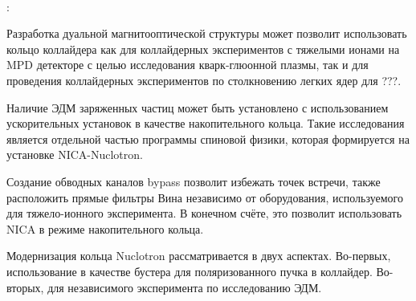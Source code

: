 ~\\
\par {\influence}:
\par Разработка дуальной магнитооптической структуры может позволит использовать кольцо коллайдера как для коллайдерных экспериментов с тяжелыми ионами на MPD детекторе с целью исследования кварк-глюонной плазмы, так и для проведения коллайдерных экспериментов по столкновению легких ядер для ???. 
\par Наличие ЭДМ заряженных частиц может быть установлено с использованием ускорительных установок в качестве накопительного кольца. Такие исследования является отдельной частью программы спиновой физики, которая формируется на установке NICA-Nuclotron.
\par Создание обводных каналов bypass позволит избежать точек встречи, также расположить прямые фильтры Вина независимо от оборудования, используемого для тяжело-ионного эксперимента. В конечном счёте, 
это позволит использовать NICA в режиме накопительного кольца.

\par Модернизация кольца Nuclotron рассматривается в двух аспектах. Во-первых, использование в качестве бустера для поляризованного пучка в коллайдер. Во-вторых, для независимого эксперимента по исследованию ЭДМ.

